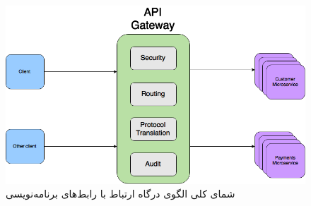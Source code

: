 \begin{figure}[H]
    \centering
	\caption{شمای‌ کلی الگوی درگاه ارتباط با رابط‌های برنامه‌نویسی}
	\label{apigateway_schema}
	\includegraphics[scale=0.4]{images/AGARC.png}
\end{figure}

\cleardoublepage 